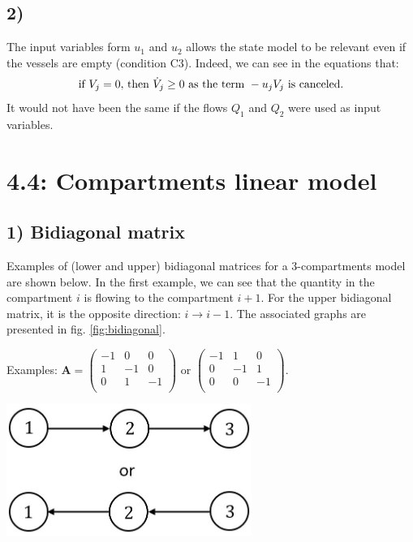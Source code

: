 \subsection*{2)}
The input variables form $u_1$ and $u_2$ allows the state model to be relevant even if the vessels are empty (condition C3). Indeed, we can see in the equations that:
\[
\textnormal{if }V_j=0\textnormal{, then }\dot{V}_j\geq 0 \textnormal{ as the term } -u_jV_j \textnormal{ is canceled.}
\]
It would not have been the same if the flows $Q_1$ and $Q_2$ were used as input variables.

\section*{4.4: Compartments linear model}

\subsection*{1) Bidiagonal matrix}
Examples of (lower and upper) bidiagonal matrices for a 3-compartments model are shown below. In the first example, we can see that the quantity in the compartment $i$ is flowing to the compartment $i+1$. For the upper bidiagonal matrix, it is the opposite direction: $i \rightarrow i-1$. The associated graphs are presented in fig. \ref{fig:bidiagonal}.\\

\begin{minipage}[l]{0.55\linewidth}
	Examples: $
	\mathbf{A}=\begin{pmatrix}
	-1 & 0 & 0\\
	1 & -1 & 0\\
	0 & 1 & -1\\
	\end{pmatrix}$ or 
	$\begin{pmatrix}
	-1 & 1 & 0\\
	0 & -1 & 1\\
	0 & 0 & -1\\
	\end{pmatrix}$.
\end{minipage}
\begin{minipage}[r]{0.4\textwidth}
	\centering
	\includegraphics[width=0.6\textwidth]{bidiag}
	\label{fig:bidiagonal}
\end{minipage}

